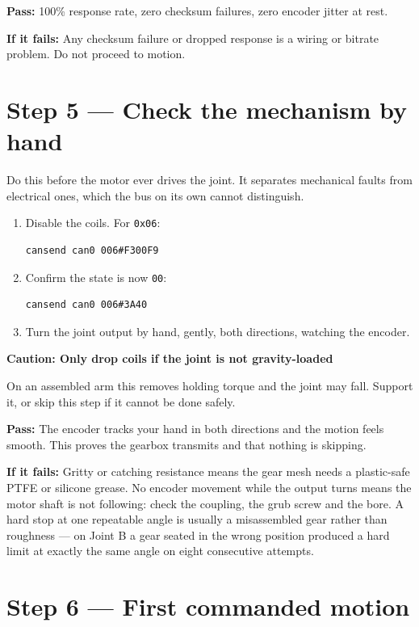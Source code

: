 \documentclass[11pt,letterpaper]{article}
\newenvironment{caution}[1]{%
    \par\addvspace{8pt}%
    \noindent{\color{cautionred}\rule{\linewidth}{0.8pt}}\par\vspace{2pt}
    \noindent\textbf{\color{cautionred}Caution: #1}\par\vspace{2pt}
}{%
    \par\vspace{2pt}\noindent{\color{cautionred}\rule{\linewidth}{0.4pt}}%
    \par\addvspace{8pt}%
}
\newcommand{\passif}[1]{\par\vspace{2pt}\noindent\textbf{\color{okgreen}Pass:} #1\par\vspace{4pt}}
\newcommand{\failif}[1]{\noindent\textbf{If it fails:} #1\par\vspace{6pt}}
\begin{document}
\passif{100\% response rate, zero checksum failures, zero encoder jitter at rest.}
\failif{Any checksum failure or dropped response is a wiring or bitrate problem. Do
not proceed to motion.}

\section*{Step 5 --- Check the mechanism by hand}

Do this before the motor ever drives the joint. It separates mechanical faults from
electrical ones, which the bus on its own cannot distinguish.

\begin{enumerate}[leftmargin=*]
    \item Disable the coils. For \texttt{0x06}:
\begin{lstlisting}
cansend can0 006#F300F9
\end{lstlisting}
    \item Confirm the state is now \texttt{00}:
\begin{lstlisting}
cansend can0 006#3A40
\end{lstlisting}
    \item Turn the joint output by hand, gently, both directions, watching the
          encoder.
\end{enumerate}

\begin{caution}{Only drop coils if the joint is not gravity-loaded}
On an assembled arm this removes holding torque and the joint may fall. Support it,
or skip this step if it cannot be done safely.
\end{caution}

\passif{The encoder tracks your hand in both directions and the motion feels smooth.
This proves the gearbox transmits and that nothing is skipping.}
\failif{Gritty or catching resistance means the gear mesh needs a plastic-safe PTFE
or silicone grease. No encoder movement while the output turns means the motor shaft
is not following: check the coupling, the grub screw and the bore. A hard stop at
one repeatable angle is usually a misassembled gear rather than roughness --- on
Joint B a gear seated in the wrong position produced a hard limit at exactly the
same angle on eight consecutive attempts.}

\section*{Step 6 --- First commanded motion}
\end{document}
